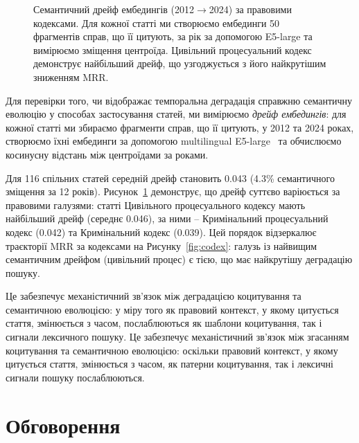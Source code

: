 \documentclass[11pt]{article}
\begin{document}
\begin{figure}[t]
\centering

\caption{Семантичний дрейф ембедингів (2012$\to$2024) за правовими кодексами. Для кожної статті ми створюємо ембединги 50 фрагментів справ, що її цитують, за рік за допомогою E5-large та вимірюємо зміщення центроїда. Цивільний процесуальний кодекс демонструє найбільший дрейф, що узгоджується з його найкрутішим зниженням MRR.}
\label{fig:drift}
\end{figure}

Для перевірки того, чи відображає темпоральна деградація справжню семантичну еволюцію у способах застосування статей, ми вимірюємо \emph{дрейф ембедингів}: для кожної статті ми збираємо фрагменти справ, що її цитують, у 2012 та 2024 роках, створюємо їхні ембединги за допомогою multilingual E5-large~\citep{wang2024multilingual} та обчислюємо косинусну відстань між центроїдами за роками.

Для 116 спільних статей середній дрейф становить 0.043 (4.3\% семантичного зміщення за 12 років).
Рисунок~\ref{fig:drift} демонструє, що дрейф суттєво варіюється за правовими галузями:
статті Цивільного процесуального кодексу мають найбільший дрейф (середнє 0.046), за ними -- Кримінальний процесуальний кодекс (0.042) та Кримінальний кодекс (0.039).
Цей порядок відзеркалює траєкторії MRR за кодексами на Рисунку~\ref{fig:codex}: галузь із найвищим семантичним дрейфом (цивільний процес) є тією, що має найкрутішу деградацію пошуку.

Це забезпечує механістичний зв'язок між деградацією коцитування та семантичною еволюцією: у міру того як правовий контекст, у якому цитується стаття, змінюється з часом, послаблюються як шаблони коцитування, так і сигнали лексичного пошуку.
Це забезпечує механістичний зв'язок між згасанням коцитування та семантичною еволюцією: оскільки правовий контекст, у якому цитується стаття, змінюється з часом, як патерни коцитування, так і лексичні сигнали пошуку послаблюються.

\section{Обговорення}
\label{sec:discussion}
\end{document}
